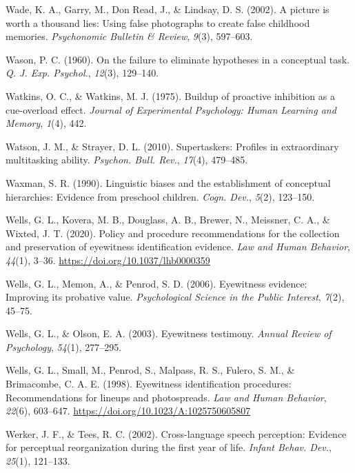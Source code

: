 \documentclass[
]{krantz}
\newlength{\cslhangindent}
\newenvironment{CSLReferences}[2] %
 {\begin{list}{}{%
  \setlength{\itemindent}{0pt}
  \setlength{\leftmargin}{0pt}
  \setlength{\parsep}{0pt}
  \ifodd #1
   \setlength{\leftmargin}{\cslhangindent}
   \setlength{\itemindent}{-1\cslhangindent}
  \fi
  \setlength{\itemsep}{#2\baselineskip}}}
 {\end{list}}
\begin{document}
\begin{CSLReferences}{1}{0}
Wade, K. A., Garry, M., Don Read, J., \& Lindsay, D. S. (2002). A picture is worth a thousand lies: Using false photographs to create false childhood memories. \emph{Psychonomic Bulletin \& Review}, \emph{9}(3), 597--603.

Wason, P. C. (1960). On the failure to eliminate hypotheses in a conceptual task. \emph{Q. J. Exp. Psychol.}, \emph{12}(3), 129--140.

Watkins, O. C., \& Watkins, M. J. (1975). Buildup of proactive inhibition as a cue-overload effect. \emph{Journal of Experimental Psychology: Human Learning and Memory}, \emph{1}(4), 442.

Watson, J. M., \& Strayer, D. L. (2010). Supertaskers: Profiles in extraordinary multitasking ability. \emph{Psychon. Bull. Rev.}, \emph{17}(4), 479--485.

Waxman, S. R. (1990). Linguistic biases and the establishment of conceptual hierarchies: Evidence from preschool children. \emph{Cogn. Dev.}, \emph{5}(2), 123--150.

Wells, G. L., Kovera, M. B., Douglass, A. B., Brewer, N., Meissner, C. A., \& Wixted, J. T. (2020). Policy and procedure recommendations for the collection and preservation of eyewitness identification evidence. \emph{Law and Human Behavior}, \emph{44}(1), 3--36. \url{https://doi.org/10.1037/lhb0000359}

Wells, G. L., Memon, A., \& Penrod, S. D. (2006). Eyewitness evidence: Improving its probative value. \emph{Psychological Science in the Public Interest}, \emph{7}(2), 45--75.

Wells, G. L., \& Olson, E. A. (2003). Eyewitness testimony. \emph{Annual Review of Psychology}, \emph{54}(1), 277--295.

Wells, G. L., Small, M., Penrod, S., Malpass, R. S., Fulero, S. M., \& Brimacombe, C. A. E. (1998). Eyewitness identification procedures: Recommendations for lineups and photospreads. \emph{Law and Human Behavior}, \emph{22}(6), 603--647. \url{https://doi.org/10.1023/A:1025750605807}

Werker, J. F., \& Tees, R. C. (2002). Cross-language speech perception: Evidence for perceptual reorganization during the first year of life. \emph{Infant Behav. Dev.}, \emph{25}(1), 121--133.


\end{CSLReferences}
\end{document}
